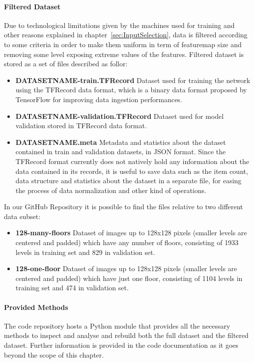  
 \paragraph{Filtered Dataset} Due to technological limitations given by the machines used for training and other reasons explained in chapter~\ref{sec:InputSelection}, data is filtered according to some criteria in order to make them uniform in term of \gls{featuremap} size and removing some level exposing extreme values of the features. Filtered dataset is stored as a set of files described as follor:
 	\begin{itemize}
		\item \textbf{DATASETNAME-train.TFRecord} Dataset used for training the network using the TFRecord data format, which is a binary data format proposed by TensorFlow for improving data ingestion performances. 
		\item \textbf{DATASETNAME-validation.TFRecord}  Dataset used for model validation stored in TFRecord data format.
		\item \textbf{DATASETNAME.meta} Metadata and statistics about the dataset contained in train and validation datasets, in JSON format. Since the TFRecord format currently does not natively hold any information about the data contained in its records, it is useful to save data such as the item count, data structure and statistics about the dataset in a separate file, for easing the process of data normalization and other kind of operations.
 	\end{itemize}
 
 In our GitHub Repository \cite{gitrepo} it is possible to find the files relative to two different data subset:
 \begin{itemize}
 	\item \textbf{128-many-floors} Dataset of images up to 128x128 pixels (smaller levels are centered and padded) which have any number of floors, consisting of 1933 levels in training set and 829 in validation set. 
 	\item \textbf{128-one-floor} Dataset of images up to 128x128 pixels (smaller levels are centered and padded) which have just one floor, consisting of 1104 levels in training set and 474 in validation set.
 	
 \end{itemize}
	\paragraph{Provided Methods} The code repository \cite{gitrepo} hosts a Python module that provides all the necessary methods to inspect and analyse and rebuild both the full dataset and the filtered dataset. Further information is provided in the code documentation as it goes beyond the scope of this chapter.
	
